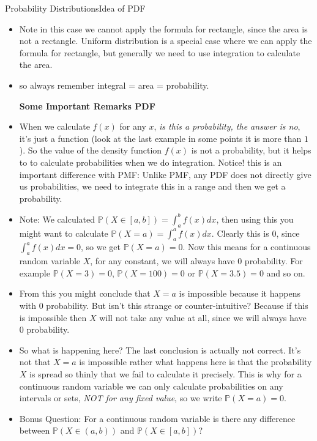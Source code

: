 \documentclass[8pt, usepdftitle=false]{beamer}
\begin{document}
\begin{frame}[allowframebreaks]{Probability Distributions}{Idea of PDF}
\begin{itemize}
\item Note in this case we cannot apply the formula for rectangle, since the area is not a rectangle. Uniform distribution is a special case where we can apply the formula for rectangle, but generally we need to use integration to calculate the area. 

\item so always remember integral = area = probability.



\framebreak

\textbf{Some Important Remarks PDF}

\item When we calculate $f(x)$ for any $x$, \emph{is this a probability, the answer is no}, it's just a function (look at the last example in some points it is more than $1$). So the value of the density function $f(x)$ is not a probability, but it helps to to calculate probabilities when we do integration. {\color{red} Notice! this is an important difference with PMF}: Unlike PMF, any  PDF does not directly give us probabilities, we need to integrate this in a range and then we get a probability. 




\item  Note: We calculated $\mathbb{P}(X \in [a, b]) = \int_{a}^{b} f(x) dx$, then using this you might want to calculate  $\mathbb{P}(X = a) = \int_{a}^{a} f(x) dx$. Clearly this is $0$, since $\int_{a}^{a} f(x) dx = 0$, so we get $\mathbb{P}(X=a)=0$. Now this means for a continuous random variable $X$, for any constant, we will always have $0$ probability. For example $\mathbb{P}(X = 3) = 0$, $\mathbb{P}(X = 100) = 0$ or $\mathbb{P}(X = 3.5) = 0$ and so on.

\item From this you might conclude that \alert{$X=a$ is impossible} because it happens with $0$ probability. But isn't this strange or counter-intuitive? Because if this is impossible then $X$ will not take any value at all, since we will always have $0$ probability.


\item So what is happening here? The last conclusion is actually not correct. It's not that \alert{$X=a$ is impossible} rather what happens here is that the probability $X$ is \alert{spread so thinly} that we fail to calculate it precisely. This is why for a continuous random variable we can only calculate probabilities on any intervals or sets, \emph{NOT for any fixed value}, so we write $\mathbb{P}(X = a) = 0$.


\item {\color{red} Bonus Question:} For a continuous random variable is there any difference between $\mathbb{P}(X \in (a, b))$ and $\mathbb{P}(X \in [a, b])$?  



\end{itemize}

\end{frame}
\end{document}
